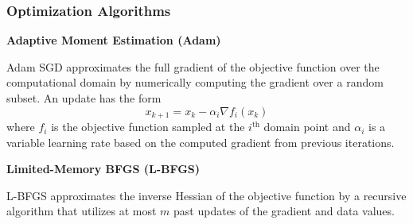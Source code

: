 \begin{frame}
    \frametitle{Optimization Algorithms}
    \textbf{Adaptive Moment Estimation (Adam)}
    
    \bigskip
    Adam SGD approximates the full gradient of the objective function over the computational domain by numerically computing the gradient over a random subset. An update has the form
    \[x_{k+1} = x_k - \alpha_i \nabla f_i(x_k)\]
    where $f_i$ is the objective function sampled at the $i^{\text{th}}$ domain point and $\alpha_i$ is a variable learning rate based on the computed gradient
    from previous iterations.

    \pause
    \bigskip

    \textbf{Limited-Memory BFGS (L-BFGS)}
    
    \bigskip
    L-BFGS approximates the inverse Hessian of the objective function by a recursive algorithm that utilizes at most $m$ past updates of the gradient and data values.
\end{frame}